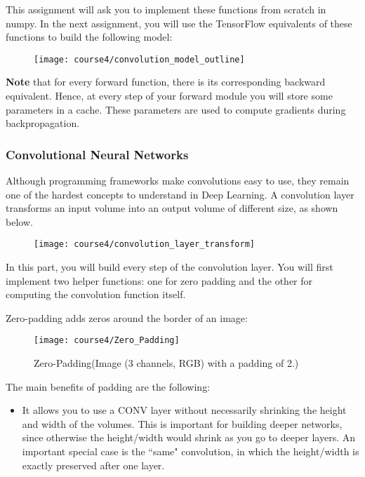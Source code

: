 {This assignment will ask you to implement these functions from scratch in numpy. In the next assignment, you will use the TensorFlow equivalents of these functions to build the following model:


\begin{figure}[h]
\begin{center}
\texttt{[image: course4/convolution\_model\_outline]}
\end{center}
\end{figure}

{\textbf {Note}} that for every forward function, there is its corresponding backward equivalent. Hence, at every step of your forward module you will store some parameters in a cache. These parameters are used to compute gradients during backpropagation.




\subsubsection{Convolutional Neural Networks}

Although programming frameworks make convolutions easy to use, they remain one of the hardest concepts to understand in Deep Learning. A convolution layer transforms an input volume into an output volume of different size, as shown below.
\clearpage
\begin{figure}[h]
\begin{center}
\texttt{[image: course4/convolution\_layer\_transform]}
\end{center}
\end{figure}

In this part, you will build every step of the convolution layer. You will first implement two helper functions: one for zero padding and the other for computing the convolution function itself.


Zero-padding adds zeros around the border of an image:
\begin{figure}[h]
\begin{center}
\texttt{[image: course4/Zero\_Padding]}
\caption{Zero-Padding(Image (3 channels, RGB) with a padding of 2.)}
\end{center}
\end{figure}

The main benefits of padding are the following:
\begin{itemize}
\item It allows you to use a CONV layer without necessarily shrinking the height and width of the volumes. This is important for building deeper networks, since otherwise the height/width would shrink as you go to deeper layers. An important special case is the ``same" convolution, in which the height/width is exactly preserved after one layer.


\end{itemize}}

